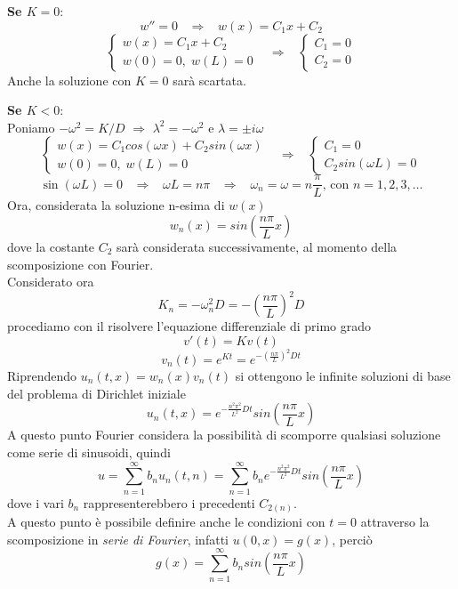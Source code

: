 {\bf Se $K=0$}:
\[
	w''=0
	\;\;\;
	\Rightarrow
	\;\;\;
	w(x)=C_1x + C_2
\]
\[
	\left\{
	\begin{array}{l}
		w(x)=C_1x + C_2\\
		w(0)=0, \; w(L)=0
	\end{array}
	\right.
	\;\;\;
	\Rightarrow
	\;\;\;
	\left\{
	\begin{array}{l}
		C_1=0\\
		C_2=0
	\end{array}
	\right.
\]
Anche la soluzione con $K=0$ sar\`a scartata.

{\bf Se $K<0$}:\\
Poniamo $-\omega^2 = K/D$ $\Rightarrow$ $\lambda^2 = - \omega^2$ e $\lambda=\pm i\omega$
\[
	\left\{
	\begin{array}{l}
		w(x)=C_1 cos(\omega x) + C_2 sin(\omega x)\\
		w(0)=0, \; w(L)=0
	\end{array}
	\right.
	\;\;\;
	\Rightarrow
	\;\;\;
	\left\{
	\begin{array}{l}
		C_1=0\\
		C_2 sin(\omega L)= 0
	\end{array}
	\right.
\]
\[
	\sin (\omega L)=0
	\;\;\;
	\Rightarrow
	\;\;\;
	\omega L = n\pi
	\;\;\;
	\Rightarrow
	\;\;\;
	\omega_n= \omega= n \frac{\pi}{L} \text{, con }n=1,2,3,\ldots
\]
Ora, considerata la soluzione n-esima di $w(x)$
\[
	w_n(x)=sin\left(\frac{n\pi}{L}x \right)
\]
dove la costante $C_2$ sar\`a considerata successivamente, al momento della scomposizione con Fourier.\\
Considerato ora
\[
	K_n=-\omega_n^2 D= -\left(\frac{n\pi}{L}\right)^2D
\]
procediamo con il risolvere l'equazione differenziale di primo grado
\[
	v'(t)= Kv(t)
\]
\[
	v_n(t)= e^{Kt}=e^{-\left(\frac{n\pi}{L}\right)^2Dt}
\]
Riprendendo  $u_n(t,x)= w_n(x) v_n(t)$ si ottengono le infinite soluzioni
di base del problema di Dirichlet iniziale
\[
	u_n(t,x)= e^{-\frac{n^2\pi^2}{L^2} Dt}
	sin\left(\frac{n\pi}{L}x \right)
\]
A questo punto Fourier considera la possibilit\`a di scomporre qualsiasi
soluzione come serie di sinusoidi, quindi
\[
	u= \sum_{n=1}^{\infty} b_n u_n(t,n)=
	\sum_{n=1}^{\infty}b_n e^{-\frac{n^2\pi^2}{L^2} Dt}
	sin\left(\frac{n\pi}{L}x \right)
\]
dove i vari $b_n$ rappresenterebbero i precedenti $C_{2(n)}$.\\
A questo punto \`e possibile definire anche le condizioni con $t=0$ attraverso
la scomposizione in \textit{serie di Fourier}, infatti $u(0,x)=g(x)$, perci\`o
\[
	g(x)= \sum_{n=1}^{\infty} b_n sin\left(\frac{n\pi}{L}x \right)
\]
